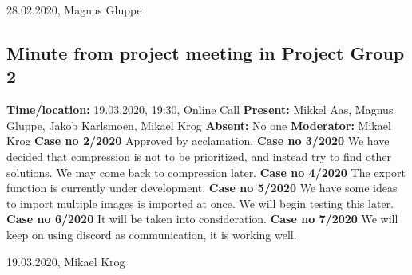\documentclass{article}
\begin{document}
\begin{flushright}28.02.2020, Magnus Gluppe\end{flushright}

\newpage
\subsection{Minute from project meeting in Project Group 2}
\newline
\textbf{Time/location:} 19.03.2020, 19:30, Online Call
\newline
\textbf{Present: }Mikkel Aas, Magnus Gluppe, Jakob Karlsmoen, Mikael Krog
\newline
\textbf{Absent:} No one
\newline
\textbf{Moderator:} Mikael Krog
\newline \newline
\textbf{Case no 2/2020} \newline
Approved by acclamation.
\newline  \newline
\textbf{Case no 3/2020}  \newline
We have decided that compression is not to be prioritized, and instead try to find other solutions. We may come back to compression later.
\newline  \newline
\textbf{Case no 4/2020}  \newline
The export function is currently under development.
\newline  \newline
\textbf{Case no 5/2020}  \newline
We have some ideas to import multiple images is imported at once. We will begin testing this later.
\newline  \newline
\textbf{Case no 6/2020}  \newline
It will be taken into consideration.
\newline  \newline
\textbf{Case no 7/2020}  \newline
We will keep on using discord as communication, it is working well.
\begin{flushright}19.03.2020, Mikael Krog\end{flushright}


\newpage
\end{document}
